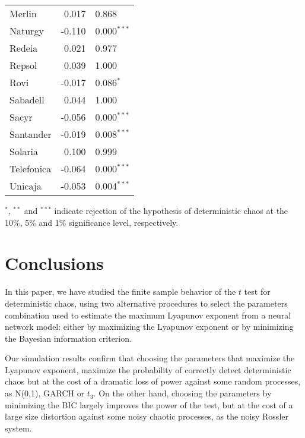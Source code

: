 \documentclass[12pt]{article}
\begin{document}
\begin{table}  [H]
\begin{tabular*}{\textwidth}{@{\extracolsep{\fill}}lrl}
        Merlin                  &  0.017 & 0.868 \\ 
        Naturgy                 & -0.110 & 0.000$^{***}$ \\ 
        Redeia                  &  0.021 & 0.977 \\ 
        Repsol                  &  0.039 & 1.000 \\ 
        Rovi                    & -0.017 & 0.086$^{*}$  \\ 
        Sabadell                &  0.044 & 1.000 \\ 
        Sacyr                   & -0.056 & 0.000$^{***}$  \\ 
        Santander               & -0.019 & 0.008$^{***}$ \\ 
        Solaria                 &  0.100 & 0.999 \\   
        Telefonica              & -0.064 & 0.000$^{***}$ \\ 
        Unicaja                 & -0.053 & 0.004$^{***}$ \\ 
        \hline      
    \end{tabular*}
        {$^{*}$, $^{**}$ and $^{***}$ indicate rejection of the hypothesis of  deterministic chaos at the 10\%, 5\% and 1\% significance level, respectively.}
\end{table}






\section{Conclusions}

In this paper, we have studied the finite sample behavior of the $t$ test
for deterministic chaos, using two alternative procedures to select the parameters
combination used to estimate the maximum Lyapunov exponent from a neural network 
model: either by maximizing the Lyapunov exponent or by minimizing the Bayesian information criterion.

Our simulation results confirm that choosing the parameters that maximize the
Lyapunov exponent, maximize the probability of correctly detect deterministic chaos
but at the cost of a dramatic loss of power against some random processes, as N(0,1),
GARCH or $t_3$. On the other hand, choosing the parameters by minimizing the BIC largely improves the power of the test, but at the cost of a large size distortion against some noisy chaotic processes, as the noisy Rossler system. 
\end{document}
